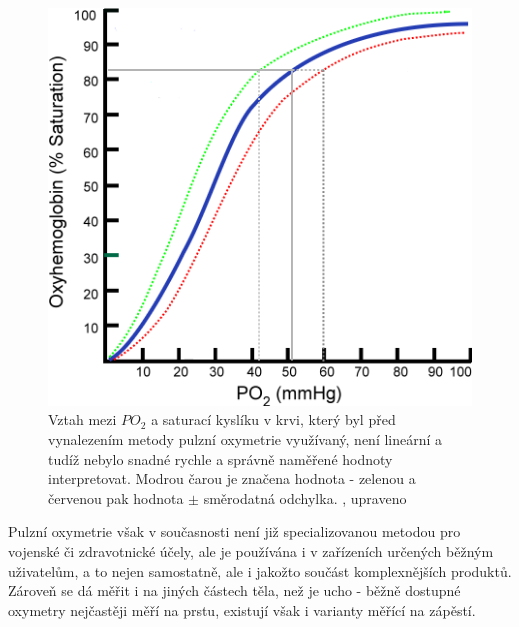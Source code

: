 \begin{figure}[H]
  \includegraphics[scale=1, center]{Kapitoly/Teoreticka/Obrazky/TlakKysliku.png}
  \caption [Vztah mezi $PO_2$ a saturací kyslíku v krvi]{Vztah mezi $PO_2$ a saturací kyslíku v krvi, který byl před vynalezením metody pulzní oxymetrie využívaný, není lineární a tudíž nebylo snadné rychle a správně naměřené hodnoty interpretovat. Modrou čarou je značena hodnota - zelenou a červenou pak hodnota $\pm$ směrodatná odchylka. \citep{ratznium_2006}, upraveno}
  \label{fig:PO2}
\end{figure}
\par Pulzní oxymetrie však v současnosti není již specializovanou metodou pro vojenské či zdravotnické účely, ale je používána i v zařízeních určených běžným uživatelům, a to nejen samostatně, ale i jakožto součást komplexnějších produktů. Zároveň se dá měřit i na jiných částech těla, než je ucho - běžně dostupné oxymetry nejčastěji měří na prstu, existují však i varianty měřící na zápěstí.
